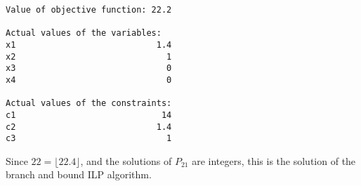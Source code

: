\documentclass[a4paper, oneside]{scrartcl}
\begin{document}
\begin{enumerate}
\begin{verbatim}
Value of objective function: 22.2

Actual values of the variables:
x1                            1.4
x2                              1
x3                              0
x4                              0

Actual values of the constraints:
c1                             14
c2                            1.4
c3                              1
\end{verbatim}

Since $22 = \lfloor 22.4 \rfloor$, and the solutions of $P_{21}$ are integers,
this is the solution of the branch and bound ILP algorithm.
\end{enumerate}
\end{document}
